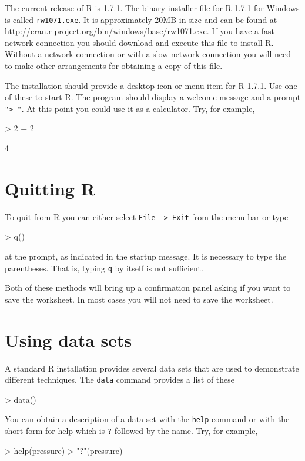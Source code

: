 \documentclass{book}
\begin{document}
The current release of R is 1.7.1.  The binary installer file for
R-1.7.1 for Windows is called \texttt{rw1071.exe}.  It is
approximately 20MB in size and can be found at
\url{http://cran.r-project.org/bin/windows/base/rw1071.exe}.  If you
have a fast network connection you should download and execute this
file to install R.  Without a network connection or with a slow
network connection you will need to make other arrangements for
obtaining a copy of this file.

The installation should provide a desktop icon or menu item for
R-1.7.1.  Use one of these to start R.  The program should display a
welcome message and a prompt \texttt{"> "}.  At this point you could
use it as a calculator.  Try, for example,
\begin{Schunk}
\begin{Sinput}
> 2 + 2
\end{Sinput}
\begin{Soutput}
[1] 4
\end{Soutput}
\end{Schunk}


\section{Quitting R}
\label{sec:quitting}

To quit from R you can either select \texttt{File -> Exit} from the
menu bar or type
\begin{Schunk}
\begin{Sinput}
> q()
\end{Sinput}
\end{Schunk}
at the prompt, as indicated in the startup message.  It is necessary
to type the parentheses.  That is, typing \texttt{q} by itself is not
sufficient.

Both of these methods will bring up a confirmation panel asking if you
want to save the worksheet.  In most cases you will not need to save
the worksheet.


\section{Using data sets}
\label{sec:builtinData}

A standard R installation provides several data sets that are used to
demonstrate different techniques.  The \texttt{data} command provides
a list of these
\begin{Schunk}
\begin{Sinput}
> data()
\end{Sinput}
\end{Schunk}
You can obtain a description of a data set with the \texttt{help}
command or with the short form for help which is \texttt{?} followed
by the name.  Try, for example,
\begin{Schunk}
\begin{Sinput}
> help(pressure)
> "?"(pressure)
\end{Sinput}
\end{Schunk}
\end{document}
